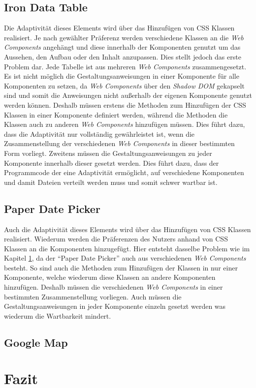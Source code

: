 \documentclass[12pt, paper=a4, bibtotoc, toc=listof, headsepline=true]{scrreprt}
\begin{document}
	\section{Iron Data Table}
	\label{sec:evaIroDatTab}
	Die Adaptivität dieses Elements wird über das Hinzufügen von \ac{CSS} Klassen realisiert. Je nach gewählter Präferenz werden verschiedene Klassen an die \emph{Web Components} angehängt und diese innerhalb der Komponenten genutzt um das Aussehen, den Aufbau oder den Inhalt anzupassen. Dies stellt jedoch das erste Problem dar. Jede Tabelle ist aus mehreren \emph{Web Components} zusammengesetzt. Es ist nicht möglich die Gestaltungsanweisungen in einer Komponente für alle Komponenten zu setzen, da \emph{Web Components} über den \emph{Shadow DOM} gekapselt sind und somit die Anweisungen nicht außerhalb der eigenen Komponente genutzt werden können. Deshalb müssen erstens die Methoden zum Hinzufügen der \ac{CSS} Klassen in einer Komponente definiert werden, während die Methoden die Klassen auch zu anderen \emph{Web Components} hinzufügen müssen. Dies führt dazu, dass die Adaptivität nur vollständig gewährleistet ist, wenn die Zusammenstellung der verschiedenen \emph{Web Components} in dieser bestimmten Form vorliegt. Zweitens müssen die Gestaltungsanweisungen zu jeder Komponente innerhalb dieser gesetzt werden. Dies führt dazu, dass der Programmcode der eine Adaptivität ermöglicht, auf verschiedene Komponenten und damit Dateien verteilt werden muss und somit schwer wartbar ist. 
	\section{Paper Date Picker} 
	Auch die Adaptivität dieses Elements wird über das Hinzufügen von \ac{CSS} Klassen realisiert. Wiederum werden die Präferenzen des Nutzers anhand von \ac{CSS} Klassen an die Komponenten hinzugefügt. Hier entsteht dasselbe Problem wie im Kapitel \ref{sec:evaIroDatTab}, da der \enquote{Paper Date Picker} auch aus verschiedenen \emph{Web Components} besteht. So sind auch die Methoden zum Hinzufügen der Klassen in nur einer Komponente, welche wiederum diese Klassen an andere Komponenten hinzufügen. Deshalb müssen die verschiedenen \emph{Web Components} in einer bestimmten Zusammenstellung vorliegen. Auch müssen die Gestaltungsanweisungen in jeder Komponente einzeln gesetzt werden was wiederum die Wartbarkeit mindert.
	\section{Google Map}
	

\chapter{Fazit}

	

	\printbibliography
\end{document}
